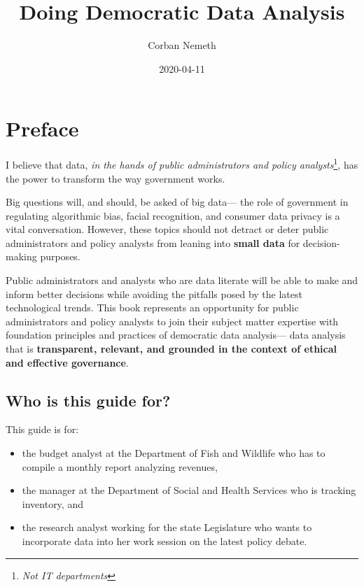 \documentclass[]{book}
\title{Doing Democratic Data Analysis}
\author{Corban Nemeth}
\date{2020-04-11}
\providecommand{\tightlist}{%
  \setlength{\itemsep}{0pt}\setlength{\parskip}{0pt}}
\begin{document}
\maketitle

{
\setcounter{tocdepth}{1}
\tableofcontents
}
\chapter*{Preface}\label{preface}

I believe that data, \emph{in the hands of public administrators and
policy analysts}\footnote{\emph{Not IT departments}}, has the power to
transform the way government works.

Big questions will, and should, be asked of big data--- the role of
government in regulating algorithmic bias, facial recognition, and
consumer data privacy is a vital conversation. However, these topics
should not detract or deter public administrators and policy analysts
from leaning into \textbf{small data} for decision-making purposes.

Public administrators and analysts who are data literate will be able to
make and inform better decisions while avoiding the pitfalls posed by
the latest technological trends. This book represents an opportunity for
public administrators and policy analysts to join their subject matter
expertise with foundation principles and practices of democratic data
analysis--- data analysis that is \textbf{transparent, relevant, and
grounded in the context of ethical and effective governance}.

\section*{Who is this guide for?}\label{who-is-this-guide-for}

This guide is for:

\begin{itemize}
\tightlist
\item
  the budget analyst at the Department of Fish and Wildlife who has to
  compile a monthly report analyzing revenues,
\item
  the manager at the Department of Social and Health Services who is
  tracking inventory, and
\item
  the research analyst working for the state Legislature who wants to
  incorporate data into her work session on the latest policy debate.
\end{itemize}
\end{document}
